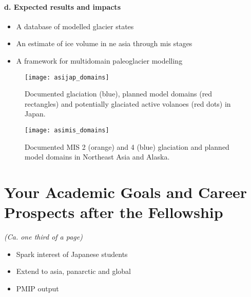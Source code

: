 \documentclass{article}
\begin{document}
\paragraph{d. Expected results and impacts}

    \begin{itemize}
      \item{A database of modelled glacier states}
      \item{An estimate of ice volume in ne asia through mis stages}
      \item{A framework for multidomain paleoglacier modelling}
    \end{itemize}

    \begin{figure}
      \centerline{\texttt{[image: asijap\_domains]}}
      \caption{%
        Documented glaciation (blue), planned model domains (red rectangles)
        and potentially glaciated active volanoes (red dots) in Japan.}
      \label{fig:japan}
    \end{figure}

    \begin{figure}
      \centerline{\texttt{[image: asimis\_domains]}}
      \caption{%
        Documented MIS 2 (orange) and 4 (blue) glaciation and planned model
        domains in Northeast Asia and Alaska.}
      \label{fig:asia}
    \end{figure}


\section{Your Academic Goals and Career Prospects after the Fellowship}

    \emph{(Ca. one third of a page)}

    \begin{itemize}
      \item{Spark interest of Japanese students}
      \item{Extend to asia, panarctic and global}
      \item{PMIP output}
    \end{itemize}

\end{document}
